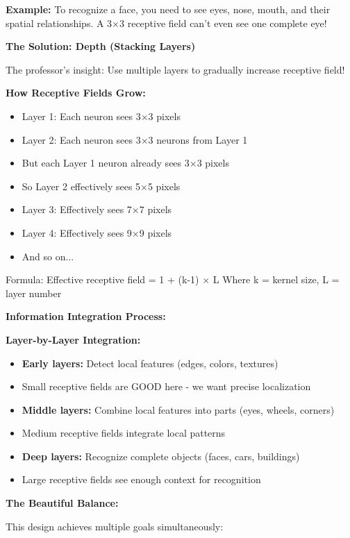 \documentclass[12pt]{article}
\newcommand{\explanation}[1]{{\color{explanationcolor}#1}}
\begin{document}
\begin{enumerate}[(a)]
{{    \textbf{Example:} 
    To recognize a face, you need to see eyes, nose, mouth, and their spatial relationships. A 3×3 receptive field can't even see one complete eye!
    }
    
    \textbf{The Solution: Depth (Stacking Layers)}
    
    \explanation{
    The professor's insight: Use multiple layers to gradually increase receptive field!
    
    \textbf{How Receptive Fields Grow:}
    \begin{itemize}
        \item Layer 1: Each neuron sees 3×3 pixels
        \item Layer 2: Each neuron sees 3×3 neurons from Layer 1
        \item But each Layer 1 neuron already sees 3×3 pixels
        \item So Layer 2 effectively sees 5×5 pixels
        \item Layer 3: Effectively sees 7×7 pixels
        \item Layer 4: Effectively sees 9×9 pixels
        \item And so on...
    \end{itemize}
    
    Formula: Effective receptive field = 1 + (k-1) × L
    Where k = kernel size, L = layer number
    }
    
    \textbf{Information Integration Process:}
    
    \explanation{
    \textbf{Layer-by-Layer Integration:}
    \begin{itemize}
        \item \textbf{Early layers:} Detect local features (edges, colors, textures)
        \item Small receptive fields are GOOD here - we want precise localization
        \item \textbf{Middle layers:} Combine local features into parts (eyes, wheels, corners)
        \item Medium receptive fields integrate local patterns
        \item \textbf{Deep layers:} Recognize complete objects (faces, cars, buildings)
        \item Large receptive fields see enough context for recognition
    \end{itemize}
    }
    
    \textbf{The Beautiful Balance:}
    
    \explanation{
    This design achieves multiple goals simultaneously:
    
}}
\end{enumerate}
\end{document}
